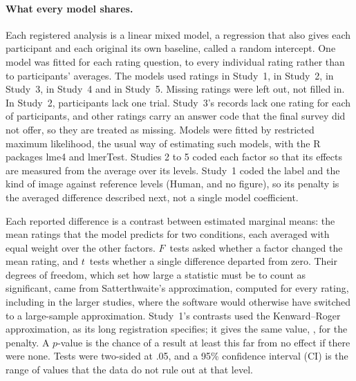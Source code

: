\paragraph*{What every model shares.}
Each registered analysis is a linear mixed model, a regression that also gives each participant and each original its own baseline, called a random intercept. One model was fitted for each rating question, to every individual rating rather than to participants' averages. The models used \SOneNRatings{} ratings in Study~1, \STwoNRatings{} in Study~2, \SThreeNRatings{} in Study~3, \SFourNRatings{} in Study~4 and \SFiveNRatings{} in Study~5. Missing ratings were left out, not filled in. In Study~2, \STwoNLackingOneTrial{} participants lack one trial. Study~3's records lack one rating for each of \SThreeNLackingOneRating{} participants, and \SThreeNAbsentCode{} other ratings carry an answer code that the final survey did not offer, so they are treated as missing. Models were fitted by restricted maximum likelihood, the usual way of estimating such models, with the R packages lme4 and lmerTest. Studies 2 to 5 coded each factor so that its effects are measured from the average over its levels. Study~1 coded the label and the kind of image against reference levels (Human, and no figure), so its penalty is the averaged difference described next, not a single model coefficient.

Each reported difference is a contrast between estimated marginal means: the mean ratings that the model predicts for two conditions, each averaged with equal weight over the other factors. $F$~tests asked whether a factor changed the mean rating, and $t$~tests whether a single difference departed from zero. Their degrees of freedom, which set how large a statistic must be to count as significant, came from Satterthwaite's approximation, computed for every rating, including in the larger studies, where the software would otherwise have switched to a large-sample approximation. Study~1's contrasts used the Kenward--Roger approximation, as its long registration specifies; it gives the same value, \SOneHOneCreatDf, for the penalty. A $p$-value is the chance of a result at least this far from no effect if there were none. Tests were two-sided at .05, and a 95\% confidence interval (CI) is the range of values that the data do not rule out at that level.

